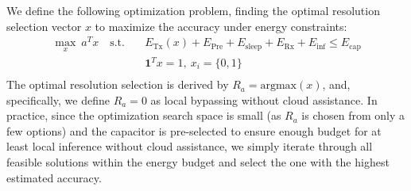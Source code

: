 We define the following optimization problem, finding the optimal resolution selection vector $x$ to maximize the accuracy under energy constraints:
\begin{equation*}
\begin{aligned}
\max_{x} \ a^{T}x \quad \textrm{s.t.} \quad & E_{\text{Tx}}(x)+E_{\text{Pre}} + E_{\text{sleep}} + E_{\text{Rx}} + E_{\text{inf}}\leq E_{\text{cap}}\\[-0.2em] 
  &\textbf{1}^Tx = 1, \ x_i = \{0, 1\} \\[-0.2em]
  \end{aligned}
\end{equation*}
The optimal resolution selection is derived by ${R_a}=\text{argmax}(x)$, and, specifically, we define ${R_a}=0$ as local bypassing without cloud assistance. In practice, since the optimization search space is small (as $R_a$ is chosen from only a few options) and the capacitor is pre-selected to ensure enough budget for at least local inference without cloud assistance, we simply iterate through all feasible solutions within the energy budget and select the one with the highest estimated accuracy.

\noindent

